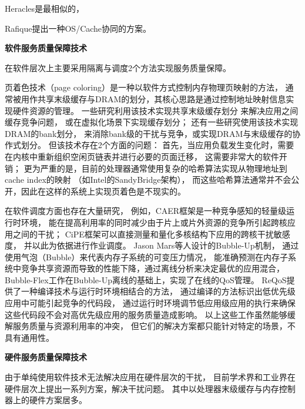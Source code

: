 Heracles是最相似的，

Rafique提出一种OS/Cache协同的方案。


\iffalse

\textbf{软件服务质量保障技术}\quad

在软件层次上主要采用隔离与调度2个方法实现服务质量保障。

%
%

页着色技术（page coloring）是一种以软件方式控制内存物理页映射的方法，
通常被用作共享末级缓存与DRAM的划分，其核心思路是通过控制地址映射信息实现硬件资源的管理。
一些研究利用该技术实现共享末级缓存划分\cite{lin_gaining_2008, tam_managing_2007}
来解决应用之间缓存竞争问题，
或在虚拟化场景下实现缓存划分\cite{Jin2009, Chen2010, Wang2012}；
还有一些研究\cite{liu_software_2012}使用该技术实现DRAM的bank划分，
来消除bank级的干扰与竞争，或实现DRAM与末级缓存的协作式划分\cite{Liu:2014:ISCA}。
但该技术存在2个方面的问题：
首先，当应用负载发生变化时，需要在内核中重新组织空闲页链表并进行必要的页面迁移，
这需要非常大的软件开销；
更为严重的是，目前的处理器通常使用复杂的哈希算法实现从物理地址到cache index的映射
（如Intel的SandyBridge架构），
而这些哈希算法通常并不会公开，因此在这样的系统上实现页着色是不现实的。

在软件调度方面也存在大量研究，
例如，CAER框架\cite{mars_contention_2010}是一种竞争感知的轻量级运行时环境，
能在提高利用率的同时减少由于片上或片外资源的竞争所引起跨核应用之间的干扰；
CiPE框架\cite{mars_directly_2011}可以直接测量和量化多核结构下应用的跨核干扰敏感度，
并以此为依据进行作业调度。
Jason Mars等人设计的Bubble-Up\cite{mars_bubble-up:_2011}机制，
通过使用气泡（Bubble）来代表内存子系统的可变压力情况，
能准确预测在内存子系统中竞争共享资源而导致的性能下降，通过离线分析来决定最优的应用混合，
Bubble-Flex\cite{yang_bubble-flux:_2013}工作在Bubble-Up离线的基础上，实现了在线的QoS管理。
ReQoS\cite{tang_reqos:_2013}提供了一种编译技术与运行时环境相结合的方法，
通过编译的方法标识出低优先级应用中可能引起竞争的代码段，
通过运行时环境调节低应用级应用的执行来确保这些代码段不会对高优先级应用的服务质量造成影响。
以上这些工作虽然能够缓解服务质量与资源利用率的冲突，
但它们的解决方案都只能针对特定的场景，不具有通用性。


\textbf{硬件服务质量保障技术}\quad

由于单纯使用软件技术无法解决应用在硬件层次的干扰，
目前学术界和工业界在硬件层次上提出一系列方案，解决干扰问题。
其中以处理器末级缓存与内存控制器上的硬件方案居多。

